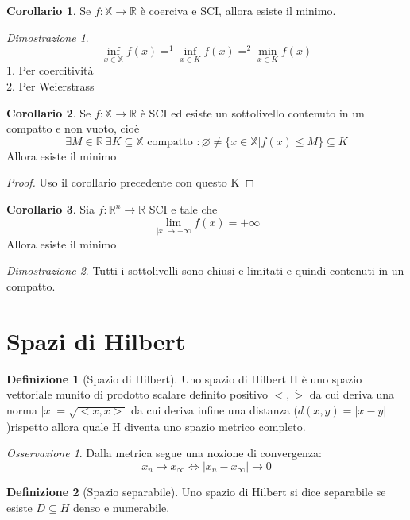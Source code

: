 \documentclass[a4paper]{book}
\theoremstyle{definition}
\newtheorem{defn}{Definizione}
\theoremstyle{remark}
\newtheorem{oss}{Osservazione}
\newtheorem{dimst}{Dimostrazione}
\theoremstyle{definition}
\newtheorem{coroll}{Corollario}
\newcommand{\bbx}{\mathbb{X}}
\newcommand{\bbr}{\mathbb{R}}
\begin{document}
\begin{coroll}
	Se $f:\bbx\to\bbr$ è coerciva e SCI, allora esiste il minimo.
\end{coroll}

\begin{dimst}
	$$\inf_{x\in\bbx} f(x) =^1 \inf_{x\in K} f(x) =^2 \min_{x \in K} f(x)$$
	1. Per coercitività\\
	2. Per Weierstrass \qedhere
\end{dimst}

\begin{coroll}
	Se $f: \bbx\to\bbr$ è SCI ed esiste un sottolivello contenuto in un compatto e non vuoto, cioè
	$$
	\exists M \in \bbr \: \exists K \subseteq \bbx \text{ compatto } : \varnothing \not= \{x \in \bbx | f(x) \le M\} \subseteq K
	$$
	Allora esiste il minimo
\end{coroll}

\begin{proof}
	Uso il corollario precedente con questo K \qedhere
\end{proof}

\begin{coroll}
	Sia $f: \bbr^n \to \bbr$ SCI e tale che $$\lim_{|x|\to +\infty}f(x) = +\infty$$ Allora esiste il minimo
\end{coroll}

\begin{dimst}
	Tutti i sottolivelli sono chiusi e limitati e quindi contenuti in un compatto.
\end{dimst}

\section{Spazi di Hilbert}
\begin{defn}[Spazio di Hilbert]
	Uno spazio di Hilbert H è uno spazio vettoriale munito di prodotto scalare definito positivo $< \dot , \dot >$ da cui deriva una norma $|x| = \sqrt{<x,x>}$ da cui deriva infine una distanza ($d(x,y) = |x-y|$)rispetto allora quale H diventa uno spazio metrico completo.
\end{defn}

\begin{oss}
	Dalla metrica segue una nozione di convergenza: $$ x_n \to x_\infty \iff |x_n - x_\infty| \to 0$$
\end{oss}

\begin{defn}[Spazio separabile]
	Uno spazio di Hilbert si dice separabile se esiste $D\subseteq H$ denso e numerabile.
\end{defn}
\end{document}
